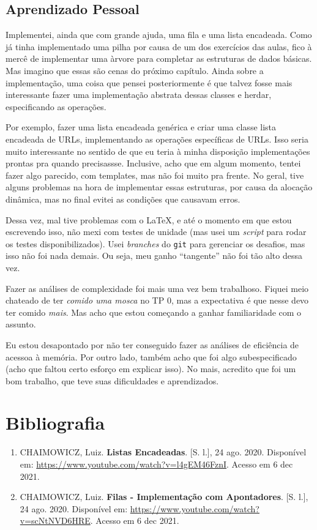 \documentclass{article}
\def\code#1{\texttt{#1}}
\begin{document}
\subsection{Aprendizado Pessoal}

Implementei, ainda que com grande ajuda, uma fila e uma lista encadeada. Como já tinha implementado uma pilha por causa de um dos exercícios das aulas, fico à mercê de implementar uma àrvore para completar as estruturas de dados básicas. Mas imagino que essas são cenas do próximo capítulo. Ainda sobre a implementação, uma coisa que pensei posteriormente é que talvez fosse mais interessante fazer uma implementação abstrata dessas classes e herdar, especificando as operações. 

Por exemplo, fazer uma lista encadeada genérica e criar uma classe lista encadeada de URLs, implementando as operações específicas de URLs. Isso seria muito interessante no sentido de que eu teria à minha disposição implementações prontas pra quando precisassse. Inclusive, acho que em algum momento, tentei fazer algo parecido, com templates, mas não foi muito pra frente. No geral, tive alguns problemas na hora de implementar essas estruturas, por causa da alocação dinâmica, mas no final evitei as condições que causavam erros.

Dessa vez, mal tive problemas com o \LaTeX, e até o momento em que estou escrevendo isso, não mexi com testes de unidade (mas usei um \textit{script} para rodar os testes disponibilizados). Usei \textit{branches} do \code{git} para gerenciar os desafios, mas isso não foi nada demais. Ou seja, meu ganho ``tangente'' não foi tão alto dessa vez.

Fazer as análises de complexidade foi mais uma vez bem trabalhoso. Fiquei meio chateado de ter \textit{comido uma mosca} no TP 0, mas a expectativa é que nesse devo ter comido \textit{mais}. Mas acho que estou começando a ganhar familiaridade com o assunto.

Eu estou desapontado por não ter conseguido fazer as análises de eficiência de acessoa à memória. Por outro lado, também acho que foi algo subespecificado (acho que faltou certo esforço em explicar isso). No mais, acredito que foi um bom trabalho, que teve suas dificuldades e aprendizados.

\section{Bibliografia}

\begin{enumerate}

    \item CHAIMOWICZ, Luiz. \textbf{Listas Encadeadas}. [S. l.], 24 ago. 2020. Disponível em: \url{https://www.youtube.com/watch?v=l4gEM46FznI}. Acesso em 6 dec 2021.

    \item CHAIMOWICZ, Luiz. \textbf{Filas - Implementação com Apontadores}. [S. l.], 24 ago. 2020. Disponível em: \url{https://www.youtube.com/watch?v=scNtNVD6HRE}. Acesso em 6 dec 2021.

\end{enumerate}
\end{document}
